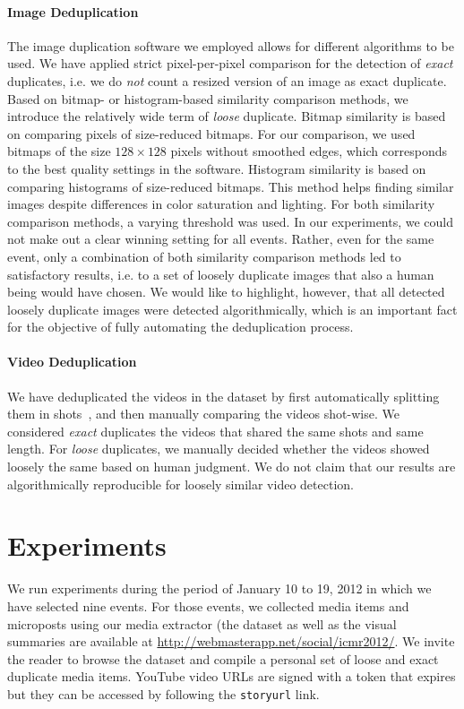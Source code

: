 \paragraph{Image Deduplication}
The image duplication software we employed allows for different algorithms to be used. We have applied strict pixel-per-pixel comparison for the detection of \emph{exact} duplicates, i.e. we do \emph{not} count a resized version of an image as exact duplicate. Based on bitmap- or histogram-based similarity comparison methods, we introduce the relatively wide term of \emph{loose} duplicate. Bitmap similarity is based on comparing pixels of size-reduced bitmaps.
For our comparison, we used bitmaps of the size $128 \times 128$ pixels without smoothed edges, which corresponds to the best quality settings in the software.
Histogram similarity is based on comparing histograms of size-reduced bitmaps. This method helps finding similar images despite differences in color saturation and lighting. For both similarity comparison methods, a varying threshold was used. In our experiments, we could not make out a clear winning setting for all events. Rather, even for the same event, only a combination of both similarity comparison methods led to satisfactory results, i.e. to a set of loosely duplicate images that also a human being would have chosen. We would like to highlight, however, that all detected loosely duplicate images were detected algorithmically, which is an important fact for the objective of fully automating the deduplication process.

\paragraph{Video Deduplication}
We have deduplicated the videos in the dataset by first automatically splitting them in shots~\cite{CrowdsourcingEvent}, and then manually comparing the videos shot-wise. We considered \emph{exact} duplicates the videos that shared the same shots and same length. For \emph{loose} duplicates, we manually decided whether the videos showed loosely the same based on human judgment. We do not claim that our results are algorithmically reproducible for loosely similar video detection.


\section{Experiments}                                                       \label{sec:experiments}
We run experiments during the period of January 10 to 19, 2012 in which we have selected nine events. For those events, we collected media items and microposts using our media extractor (the dataset as well as the visual summaries are available at \url{http://webmasterapp.net/social/icmr2012/}. We invite the reader to browse the dataset and compile a personal set of loose and exact duplicate media items. YouTube video URLs are signed with a token that expires but they can be accessed by following the \texttt{storyurl} link.

